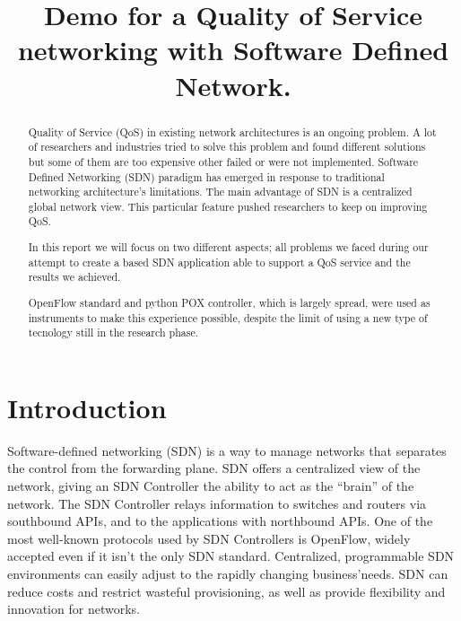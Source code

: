 \documentclass[article,10pt]{IEEEtran}
\begin{document}
\title{Demo for a Quality of Service networking with Software Defined Network.}

\author{
}

\maketitle		

\begin{abstract}
Quality of Service (QoS) in existing network architectures is an ongoing problem.
A lot of researchers and industries tried to solve this problem and found different solutions but some of them are too
expensive other failed or were not implemented.
Software Defined Networking (SDN) paradigm has emerged in response to traditional networking architecture's limitations.
The main advantage of SDN is a centralized global network view. This particular feature pushed researchers to keep on improving QoS.

In this report we will focus on two different aspects; all problems we faced during our attempt to create a based SDN application able to
support a QoS service and the results we achieved.

OpenFlow standard and python POX controller, which is largely spread, were used as instruments to make this experience possible,
despite the limit of using a new type of tecnology still in the research phase.
\end{abstract}

\section{Introduction}\label{sec:intro}
Software-defined networking (SDN) is a way to manage networks that separates the control from the forwarding plane.
SDN offers a centralized view of the network, giving an SDN Controller the ability to act as the “brain” of the network.
The SDN Controller relays information to switches and routers via southbound APIs, and to the applications with northbound APIs.
One of the most well-known protocols used by SDN Controllers is OpenFlow, widely accepted even if it isn’t the only SDN standard. 
Centralized, programmable SDN environments can easily adjust to the rapidly changing business'needs. SDN can reduce costs and restrict
wasteful provisioning, as well as provide flexibility and innovation for networks.
\end{document}
